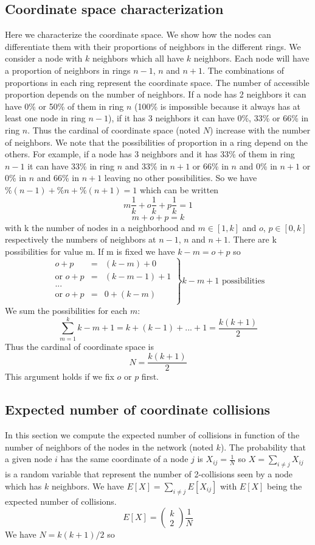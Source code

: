 \documentclass[a4paper]{article}
\begin{document}
\subsection{Coordinate space characterization}
Here we characterize the coordinate space. We show how the nodes can differentiate them with their proportions of neighbors in the different rings. We consider a node with $k$ neighbors which all have $k$ neighbors. Each node will have a proportion of neighbors in rings $n-1$, $n$ and $n+1$. The combinations of proportions in each ring represent the coordinate space. The number of accessible proportion depends on the number of neighbors. If a node has 2 neighbors it can have 0\% or 50\% of them in ring $n$ (100\% is impossible because it always has at least one node in ring $n-1$), if it has 3 neighbors it can have 0\%, 33\% or 66\% in ring $n$. Thus the cardinal of coordinate space (noted $N$) increase with the number of neighbors. We note that the possibilities of proportion in a ring depend on the others. For example, if a node has 3 neighbors and it has 33\% of them in ring $n-1$ it can have 33\% in ring $n$ and 33\% in $n+1$ or 66\% in $n$ and 0\% in $n+1$ or 0\% in $n$ and 66\% in $n+1$ leaving no other possibilities. 
So we have $\%(n-1)+\%n+\%(n+1)=1$ which can be written 
\[
m\frac{1}{k}+o\frac{1}{k}+p\frac{1}{k}=1
\]
\[
 m+o+p=k
\]
with k the number of nodes in a neighborhood and $m \in [1,k]$ and $o$, $p \in [0,k]$ respectively the numbers of neighbors at $n-1$, $n$ and $n+1$. There are k possibilities for value m. If m is fixed we have $k-m=o+p$ so 
\[
 \left.
  \begin{array}{rcr}
   o+p & = & (k-m)+0 \\
   \mbox{or } o+p & = & (k-m-1)+1 \\
   \mbox{...} \\
   \mbox{or } o+p & = & 0+(k-m) \\
  \end{array}
\right\} k-m+1 \mbox{ possibilities}
\]
We sum the possibilities for each $m$:
\[
 \sum_{m=1}^{k} k-m+1 = k+(k-1)+...+1=\frac{k(k+1)}{2}
\]
Thus the cardinal of coordinate space is 
\[
N=\frac{k(k+1)}{2}
\]
This argument holds if we fix $o$ or $p$ first.

\subsection{Expected number of coordinate collisions}
In this section we compute the expected number of collisions in function of the number of neighbors of the nodes in the network (noted $k$). 
The probability that a given node $i$ has the same coordinate of a node $j$ is $X_{ij}=\frac{1}{N}$ so $X=\sum_{i\ne j} X_{ij}$ is a random variable that represent the number of 2-collisions seen by a node which has $k$ neighbors. We have $E[X]=\sum_{i\ne j} E[X_{ij}]$ with $E[X]$ being the expected number of collisions.
\[
 E[X]=\left(\!\!\!
  \begin{array}{c}
    k \\
    2
  \end{array}
  \!\!\!\right) \frac{1}{N}
\]
We have $N=k(k+1)/2$ so
\end{document}
